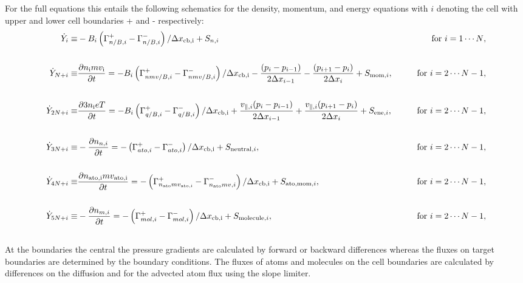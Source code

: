 \documentclass[amsmath,amssymb,a4]{revtex4-2}
\begin{document}
For the full equations this entails the following schematics for the density, momentum, and energy equations with $i$ denoting the cell with upper and lower cell boundaries + and - respectively:
\begin{eqnarray}
    \dot{Y}_{i} \equiv& - B_i \left( \Gamma_{n/B,i}^+ -\Gamma_{n/B,i}^- \right)/ \Delta x_{\rm cb,i} + S_{n,i} &\quad\quad\hbox{for $i = 1 \cdots N$}, \nonumber \\ \nonumber \\
    \dot{Y}_{N + i} \equiv& \frac{\partial n_{\rm i}mv_{\rm i}}{\partial t} = -  B_i \left( \Gamma_{nmv/B,i}^+ -\Gamma_{nmv/B,i}^- \right)/\Delta x_{\rm cb,i} - \frac{(p_i-p_{i-1})}{2\Delta x_{i-1}} - \frac{(p_{i+1}-p_{i})}{2\Delta x_{i}} + S_{{\rm mom},i},&\quad\quad\hbox{for $i = 2 \cdots N-1$}, \nonumber \\ \nonumber \\
    \dot{Y}_{2N + i} \equiv& \frac{\partial 3n_{\rm i}eT}{\partial t} = -  B_i \left( \Gamma_{q/B,i}^+ -\Gamma_{q/B,i}^- \right)/\Delta x_{\rm cb,i} + \frac{v_{\|,i}(p_i-p_{i-1})}{2\Delta x_{i-1}} + \frac{v_{\|,i}(p_{i+1}-p_{i})}{2\Delta x_{i}} + S_{{\rm ene},i},&\quad\quad\hbox{for $i = 2 \cdots N-1$}, \nonumber \\ \nonumber \\
     \dot{Y}_{3N + i} \equiv& -\frac{\partial n_{n,i}}{\partial t} =-\left( \Gamma_{ ato,i}^+ -\Gamma_{ato,i}^- \right)/\Delta x_{\rm cb,i} + S_{{\rm neutral},i},&\quad\quad\hbox{for $i = 2 \cdots N-1$}, \nonumber \\ \nonumber \\
     \dot{Y}_{4N + i} \equiv& \frac{\partial n_{\rm ato, i}mv_{\rm ato,i}}{\partial t} = - \left( \Gamma_{n_{\rm ato}mv_{\rm ato,i}}^+ -\Gamma_{n_{\rm ato}mv,i}^- \right)/\Delta x_{\rm cb,i} + S_{{\rm ato,mom},i},&\quad\quad\hbox{for $i = 2 \cdots N-1$}, \nonumber \\ \nonumber \\
      \dot{Y}_{5N + i} \equiv& -\frac{\partial n_{m,i}}{\partial t} =-\left( \Gamma_{ mol,i}^+ -\Gamma_{mol,i}^- \right)/\Delta x_{\rm cb,i} + S_{{\rm molecule},i},&\quad\quad\hbox{for $i = 2 \cdots N-1$}, \nonumber \\ \nonumber \\
\end{eqnarray}
At the boundaries the central the pressure gradients are calculated by forward or backward differences whereas the fluxes on target boundaries are determined by the boundary conditions.  The fluxes of atoms and molecules on the cell boundaries are calculated by differences on the diffusion and for the advected atom flux using the slope limiter.
\newpage 
\end{document}
